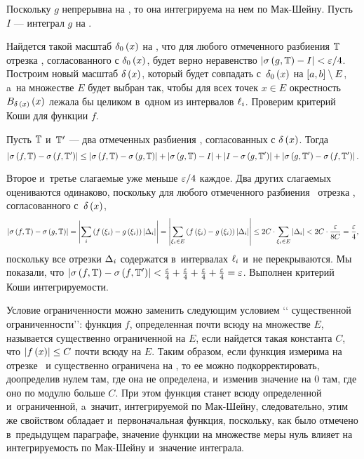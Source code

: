 \documentclass[draft]{article}
\begin{document}
\smallskip

Поскольку $g$ непрерывна на \ab, то она интегрируема на нем по
Мак-Шейну. Пусть $I$ --- интеграл $g$ на \ab.

\smallskip

Найдется такой масштаб $\de_0\atx$ на \ab, что для любого
отмеченного разбиения $\mathbb{T}$ отрезка \ab, согласованного с
$\de_0\atx$, будет верно неравенство $\abs{\isgT-I}<\ep/4$. Построим
новый масштаб $\dex$, который будет совпадать с~$\de_0\atx$ на
$\segab\setminus E$, a~на множестве $E$ будет выбран так, чтобы для
всех точек $x\in E$ окрестность $B_{\de\,\atx}\atx$ лежала бы
целиком в~одном из интервалов $\ell_{ i}$. Проверим критерий Коши для
функции $f$.

\smallskip

Пусть $\mathbb{T}$ и~$\mathbb{T}'$ --- два отмеченных разбиения \ab, согласованных с
$\dex$. Тогда
$$\abs{\isfT-\isfTp}\le\abs{\isfT-\isgT}+\abs{\isgT-I}+\abs{I-\isgTp}+\abs{\isgTp-\isfTp}.$$

Второе и~третье слагаемые уже меньше $\varepsilon/4$ каждое. Два других
слагаемых оцениваются одинаково, поскольку для любого отмеченного
разбиения \Tdixif\ отрезка \ab, согласованного с~$\dex$,
$$\abs{\isfT-\isgT}=\abs{\sumi\at({f\at(\xii)-g\at(\xii)})\ldei}
=\abs{\sum_{\xii\in E}\at({f\at(\xii)-g\at(\xii)})\ldei}\le
2C\cdot\sum_{\xii\in E}\ldei<2C\cdot{\ep\over8C}={\ep\over4},$$
поскольку все отрезки $\Delta_i$ содержатся в~интервалах $\ell_{ i}$ и~не
перекрываются. Мы показали, что
$\abs{\isfT-\isfTp}<{\ep\over4}+{\ep\over4}+{\ep\over4}+{\ep\over4}=\ep$.
Выполнен критерий Коши интегрируемости.

\prtm

\eject

{\small \rem

Условие ограниченности можно заменить следующим  условием \lq\lq
существенной ограниченности\rq\rq: функция $f$, определенная почти
всюду на множестве $E$, называется существенно ограниченной на $E$,
если найдется такая константа $C$, что $\abs{f\atx}\le C$ почти
всюду на $E$. Таким образом, если функция измерима на отрезке \ab\ и
существенно ограничена на \ab, то ее можно подкорректировать,
доопределив нулем там, где она не определена, и~изменив значение на
0 там, где оно по модулю больше $C$. При этом функция станет всюду
определенной и~ограниченной, a~значит, интегрируемой по Мак-Шейну,
следовательно, этим же свойством обладает и~первоначальная функция,
поскольку, как было отмечено в~предыдущем параграфе, значение
функции на множестве меры нуль влияет на интегрируемость по
Мак-Шейну и~значение интеграла.}
\end{document}
